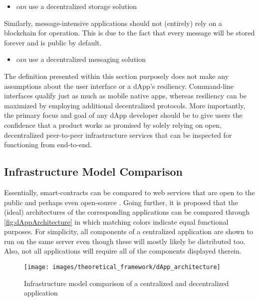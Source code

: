 \begin{description}[format={\storedescriptionlabel}]
	\begin{itemize}
		\item \textit{can} use a decentralized storage solution
	\end{itemize}
	
	Similarly, message-intensive applications should not (entirely) rely on a blockchain for operation. This is due to the fact that every message will be stored forever and is public by default. 
	
	\begin{itemize}
		\item \textit{can} use a decentralized messaging solution
	\end{itemize}
\end{description}

The definition presented within this section purposely does not make any assumptions about the user interface or a \ac{dApp}'s resiliency. Command-line interfaces qualify just as much as mobile native apps, whereas resiliency can be maximized by employing additional decentralized protocols. More importantly, the primary focus and goal of any \ac{dApp} developer should be to give users the confidence that a product works as promised by solely relying on open, decentralized peer-to-peer infrastructure services that can be inspected for functioning from end-to-end.

\subsection{Infrastructure Model Comparison}
Essentially, smart-contracts can be compared to web services that are open to the public and perhaps even open-source \cite[p.~120]{solidityDocs}. Going further, it is proposed that the (ideal) architectures of the corresponding applications can be compared through \autoref{fig:dAppArchitecture} in which matching colors indicate equal functional purposes. For simplicity, all components of a centralized application are shown to run on the same server even though these will mostly likely be distributed too. Also, not all applications will require all of the components displayed therein.

\begin{figure}[hbt]
	\centering
  	\texttt{[image: images/theoretical\_framework/dApp\_architecture]}
  	\caption{Infrastructure model comparison of a centralized and decentralized application}
  	\label{fig:dAppArchitecture}
\end{figure}

